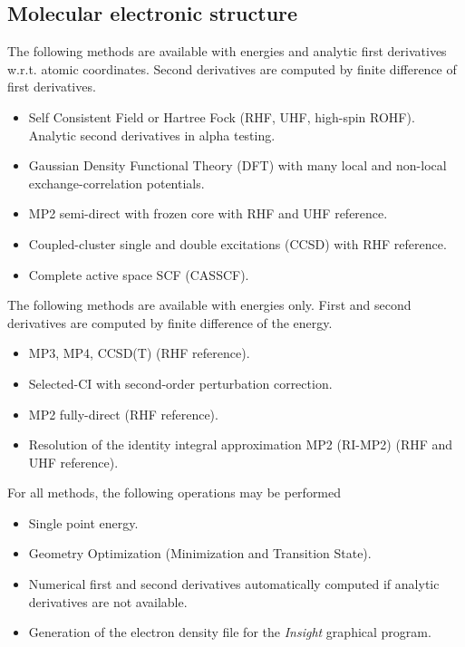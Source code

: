 \label{sec:functionality}

\subsection{Molecular electronic structure}

The following methods are available with energies and analytic first
derivatives w.r.t. atomic coordinates.  Second derivatives are
computed by finite difference of first derivatives.
\begin{itemize}
\item Self Consistent Field or Hartree Fock (RHF, UHF, high-spin
  ROHF).  Analytic second derivatives in alpha testing.  
\item Gaussian Density Functional Theory (DFT) with many local and
  non-local exchange-correlation potentials.
\item MP2 semi-direct with frozen core with RHF and UHF reference.
\item Coupled-cluster single and double excitations (CCSD) with RHF
  reference.
\item Complete active space SCF (CASSCF).
\end{itemize}

The following methods are available with energies only.  First and
second derivatives are computed by finite difference of the energy.
\begin{itemize}
\item MP3, MP4, CCSD(T) (RHF reference).
\item Selected-CI with second-order perturbation correction.
\item MP2 fully-direct (RHF reference).
\item Resolution of the identity integral approximation MP2 (RI-MP2)
  (RHF and UHF reference).
\end{itemize}

For all methods, the following operations may be performed
\begin{itemize}
\item Single point energy.
\item Geometry Optimization (Minimization and Transition State).
\item Numerical first and second derivatives automatically computed if
  analytic derivatives are not available.
\item Generation of the electron density file for the {\em Insight}
      graphical program.
\end{itemize}

